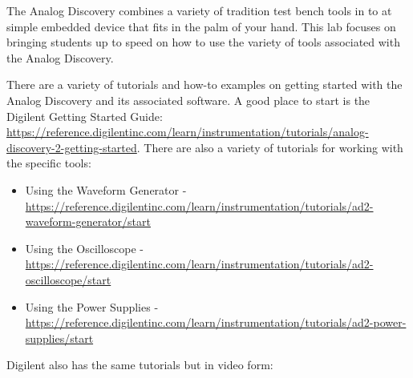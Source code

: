 The Analog Discovery combines a variety of tradition test bench tools in to at simple embedded device that fits in the palm of your hand. This lab focuses on bringing students up to speed on how to use the variety of tools associated with the Analog Discovery. 

There are a variety of tutorials and how-to examples on getting started with the Analog Discovery and its associated software. A good place to start is the Digilent Getting Started Guide: \url{https://reference.digilentinc.com/learn/instrumentation/tutorials/analog-discovery-2-getting-started}. There are also a variety of tutorials for working with the specific tools: 

\begin{itemize}
	\item Using the Waveform Generator - \url{https://reference.digilentinc.com/learn/instrumentation/tutorials/ad2-waveform-generator/start}
	\item Using the Oscilloscope - \url{https://reference.digilentinc.com/learn/instrumentation/tutorials/ad2-oscilloscope/start}
	\item Using the Power Supplies - \url{https://reference.digilentinc.com/learn/instrumentation/tutorials/ad2-power-supplies/start}
\end{itemize}

Digilent also has the same tutorials but in video form: 

